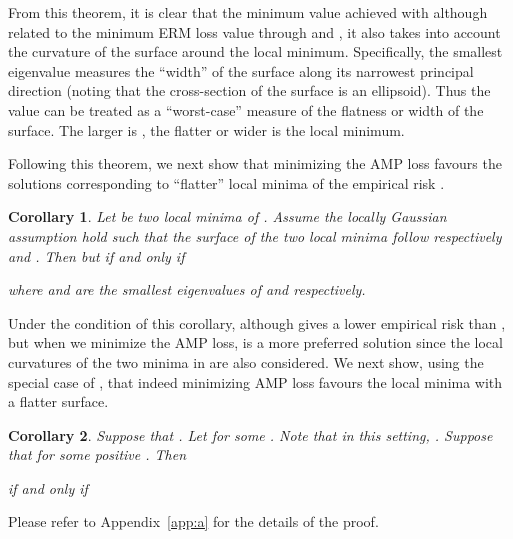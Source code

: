 \documentclass[final]{cvpr}
\newtheorem{cor}{Corollary}
\begin{document}
From this theorem, it is clear that the minimum value achieved with  although related to the minimum ERM loss value  through  and , it also takes into account the curvature of the surface around the local minimum. Specifically, the smallest eigenvalue  measures the ``width'' of the surface along its narrowest principal direction (noting that the cross-section of the surface is an ellipsoid).  Thus the value  can be treated as a ``worst-case'' measure of the flatness or width of the surface. The larger is , the flatter or wider is the local minimum. 

Following this theorem, we next show that minimizing the AMP loss  favours the solutions corresponding to ``flatter'' local minima of the empirical risk . 

\begin{cor}
Let  be two local minima of . Assume the locally Gaussian assumption hold such that the surface of the two local minima follow respectively  and . Then  but  if and only if 

where  and  are the smallest eigenvalues of  and  respectively. 
\end{cor}

Under the condition of this corollary, although  gives a lower empirical risk than , but when we minimize the AMP loss,  is a more preferred solution since the local curvatures of the two minima in  are also considered. We next show, using the special case of , that indeed minimizing AMP loss favours the local minima with a flatter surface. 

\begin{cor}\label{cor2}
Suppose that . Let  for some . Note that in this setting, . Suppose that  for some positive . Then 

if and only if

\end{cor}
Please refer to Appendix~\ref{app:a} for the details of the proof.
\end{document}
